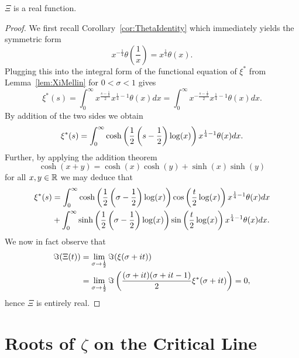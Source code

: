 \begin{lemma}
	$\Xi$ is a real function.
\end{lemma}
\begin{proof}
	We first recall Corollary~\ref{cor:ThetaIdentity} which immediately yields the symmetric form
\begin{equation*}
	x^{-\frac{1}{4}} \theta(\frac{1}{x}) = x^{\frac{1}{4}} \theta(x).
\end{equation*}
	Plugging this into the integral form of the functional equation of $\xi^*$ from Lemma~\ref{lem:XiMellin} for $0 < \sigma < 1$ gives
\begin{equation*}
	\xi^*(s) = \int _0 ^\infty x^{\frac{s - \frac{1}{2}}{2}} x^{\frac{1}{4} - 1} \theta(x) dx = \int _0 ^\infty x^{-\frac{s - \frac{1}{2}}{2}} x^{\frac{1}{4} - 1} \theta(x) dx.
\end{equation*}
	By addition of the two sides we obtain
\begin{equation*}
	\xi^*(s) = \int _0 ^\infty \cosh\left(\frac{1}{2} \left(s - \frac{1}{2}\right) \log(x)\right) x^{\frac{1}{4} - 1} \theta(x) dx.
\end{equation*}
	Further, by applying the addition theorem
\begin{equation*}
	\cosh(x + y) = \cosh(x)\cosh(y) + \sinh(x) \sinh(y)
\end{equation*}	
	for all $x,y \in \mathbb{R}$ we may deduce that
\begin{equation*}
\begin{aligned}	
	\xi^*(s) 
		&= \int _0 ^\infty \cosh\left(\frac{1}{2} \left(\sigma - \frac{1}{2}\right) \log(x)\right) \cos\left(\frac{t}{2} \log(x)\right) x^{\frac{1}{4} - 1} \theta(x) dx \\
		&+ \int _0 ^\infty \sinh\left(\frac{1}{2} \left(\sigma - \frac{1}{2}\right) \log(x)\right) \sin\left(\frac{t}{2} \log(x)\right) x^{\frac{1}{4} - 1} \theta(x) dx.
\end{aligned}
\end{equation*}
	We now in fact observe that
\begin{equation*}
\begin{aligned}	
	\Im(\Xi(t)) 
	&= \lim _{\sigma \to \frac{1}{2}} \Im(\xi(\sigma + it)) \\
	&= \lim _{\sigma \to \frac{1}{2}} \Im\left(\frac{(\sigma + it)(\sigma + it - 1)}{2}\xi^*(\sigma + it)\right) = 0,
\end{aligned}
\end{equation*}
	hence $\Xi$ is entirely real.
\end{proof}


\section{Roots of $\zeta$ on the Critical Line}


